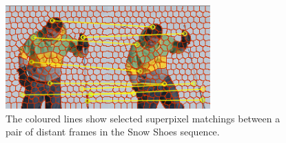    \begin{figure}[thpb]
      \centering
      \includegraphics[width=0.7\textwidth]{../images/matches_snowshoes.png}
      \caption{The coloured lines show selected superpixel
		matchings between a pair of distant frames in the Snow Shoes sequence.}
      \label{figurelabel_matchessnow}
   \end{figure}   
	\setlength{\belowcaptionskip}{-10pt}